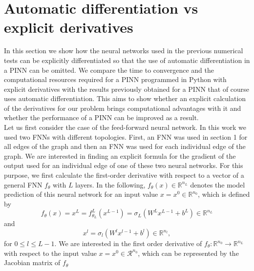 \section{Automatic differentiation vs explicit derivatives}
\label{ch3:sec3}

In this section we show how the neural networks used in the previous numerical tests can be explicitly differentiated so that the use of automatic differentiation in a PINN can be omitted. We compare the time to convergence and the computational resources required for a PINN programmed in Python with explicit derivatives with the results previously obtained for a PINN that of course uses automatic differentiation. This aims to show whether an explicit calculation of the derivatives for our problem brings computational advantages with it and whether the performance of a PINN can be improved as a result. \\
Let us first consider the case of the feed-forward neural network. In this work we used two FNNs with different topologies. First, an FNN was used in section 1 for all edges of the graph and then an FNN was used for each individual edge of the graph. We are interested in finding an explicit formula for the gradient of the output used for an individual edge of one of these two neural networks. For this purpose, we first calculate the first-order derivative with respect to a vector of a general FNN $f_{\theta}$ with $L$ layers. In the following, $f_{\theta}(x) \in \mathbb{R}^{n_L}$ denotes the model prediction of this neural network for an input value $x = x^0 \in \mathbb{R}^{n_0}$, which is defined by 
\begin{equation}
    \label{model prediction}
    f_{\theta}(x) = x^{L} = f^{L}_{\theta_L}(x^{L-1}) = \sigma_{L} (W^{L} x^{L-1} + b^{L}) \in \mathbb{R}^{n_L} 
\end{equation}
and 
\begin{equation*}
    x^{l} = \sigma_{l} (W^{l} x^{l-1} + b^{l}) \in \mathbb{R}^{n_l}, 
\end{equation*}
for $0 \leq l \leq L-1$. We are interested in the first order derivative of $f_{\theta} \colon \mathbb{R}^{n_0} \to \mathbb{R}^{n_L}$ with respect to the input value $x = x^0 \in \mathcal{R}^{n_0}$, which can be represented by the Jacobian matrix of $f_{\theta}$
